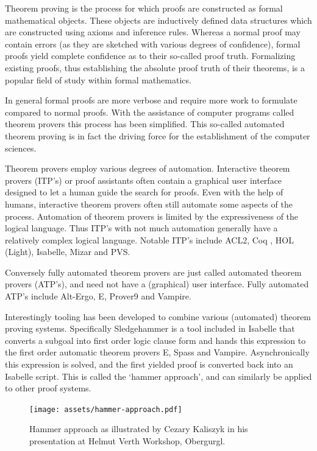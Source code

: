 Theorem proving is the process for which proofs are constructed as formal mathematical objects.
These objects are inductively defined data structures which are constructed using axioms and inference rules.
Whereas a normal proof may contain errors (as they are sketched with various degrees of confidence),
formal proofs yield complete confidence as to their so-called proof truth.
Formalizing existing proofs, thus establishing the absolute proof truth of their theorems, is a popular field of study within formal mathematics.

In general formal proofs are more verbose and require more work to formulate compared to normal proofs.
With the assistance of computer programs called theorem provers this process has been simplified.
This so-called automated theorem proving is in fact the driving force for the establishment of the computer sciences.

Theorem provers employ various degrees of automation.
Interactive theorem provers (ITP's) or proof assistants often contain a graphical user interface designed to let a human guide the search for proofs.
Even with the help of humans, interactive theorem provers often still automate some aspects of the process.
Automation of theorem provers is limited by the expressiveness of the logical language.
Thus ITP's with not much automation generally have a relatively complex logical language.
Notable ITP's include ACL2, Coq \cite{bertot2013interactive}, HOL (Light), Isabelle, Mizar and PVS.

Conversely fully automated theorem provers are just called automated theorem provers (ATP's), and need not have a (graphical) user interface.
Fully automated ATP's include Alt-Ergo, E, Prover9 and Vampire.

Interestingly tooling has been developed to combine various (automated) theorem proving systems.
Specifically Sledgehammer \cite{meng2006automation} is a tool included in Isabelle that converts a subgoal into first order logic clause form and
hands this expression to the first order automatic theorem provers E, Spass and Vampire.
Asynchronically this expression is solved, and the first yielded proof is converted back into an Isabelle script.
This is called the `hammer approach', and can similarly be applied to other proof systems.

\begin{figure}[H]
  \centerline{\texttt{[image: assets/hammer-approach.pdf]}}
  \caption{Hammer approach as illustrated by Cezary Kaliszyk in his presentation at Helmut Verth Workshop, Obergurgl.}
  \label{figure:hammer-approach}
\end{figure}

